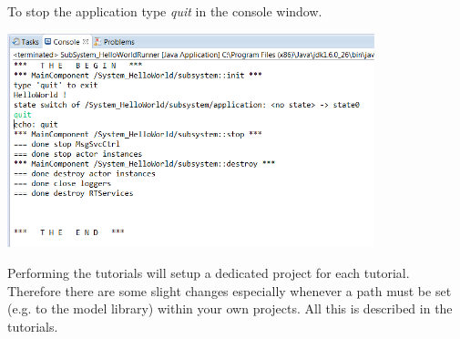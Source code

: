 To stop the application type \emph{quit} in the console window.
 
\includegraphics[width=0.8\textwidth]{images/013-SetupWorkspace07.png} 

Performing the tutorials will setup a dedicated project for each tutorial. Therefore there are some 
slight changes especially whenever a path must be set (e.g. to the model library) within your own 
projects. All this is described in the tutorials.
